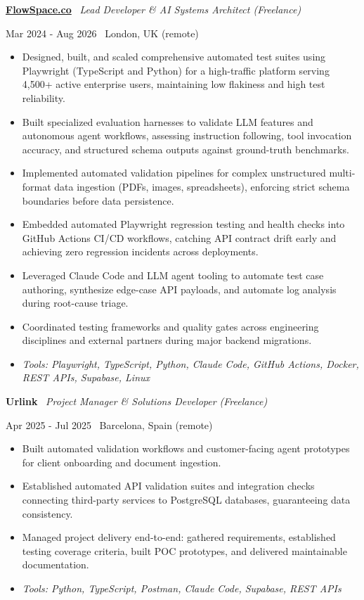 \documentclass[a4paper,10pt]{article}
\newcommand{\role}[4]{%
 \vspace{2pt}\noindent
 \begin{minipage}[t]{0.70\textwidth}\raggedright\textbf{#1} \textbullet\ \textit{#3}\end{minipage}%
 \hfill
 \begin{minipage}[t]{0.28\textwidth}\raggedleft\footnotesize\color{gray}#2 \textbullet\ #4\end{minipage}%
 \vspace{1pt}%
}
\begin{document}
\role{\href{https://flowspace.co}{FlowSpace.co}}{Mar 2024 - Aug 2026}{Lead Developer \& AI Systems Architect (Freelance)}{London, UK (remote)}
\begin{itemize}
 \item Designed, built, and scaled comprehensive automated test suites using Playwright (TypeScript and Python) for a high-traffic platform serving 4,500+ active enterprise users, maintaining low flakiness and high test reliability.
 \item Built specialized evaluation harnesses to validate LLM features and autonomous agent workflows, assessing instruction following, tool invocation accuracy, and structured schema outputs against ground-truth benchmarks.
 \item Implemented automated validation pipelines for complex unstructured multi-format data ingestion (PDFs, images, spreadsheets), enforcing strict schema boundaries before data persistence.
 \item Embedded automated Playwright regression testing and health checks into GitHub Actions CI/CD workflows, catching API contract drift early and achieving zero regression incidents across deployments.
 \item Leveraged Claude Code and LLM agent tooling to automate test case authoring, synthesize edge-case API payloads, and automate log analysis during root-cause triage.
 \item Coordinated testing frameworks and quality gates across engineering disciplines and external partners during major backend migrations.
 \item \textit{Tools: Playwright, TypeScript, Python, Claude Code, GitHub Actions, Docker, REST APIs, Supabase, Linux}
\end{itemize}

\role{Urlink}{Apr 2025 - Jul 2025}{Project Manager \& Solutions Developer (Freelance)}{Barcelona, Spain (remote)}
\begin{itemize}
 \item Built automated validation workflows and customer-facing agent prototypes for client onboarding and document ingestion.
 \item Established automated API validation suites and integration checks connecting third-party services to PostgreSQL databases, guaranteeing data consistency.
 \item Managed project delivery end-to-end: gathered requirements, established testing coverage criteria, built POC prototypes, and delivered maintainable documentation.
 \item \textit{Tools: Python, TypeScript, Postman, Claude Code, Supabase, REST APIs}
\end{itemize}
\end{document}
